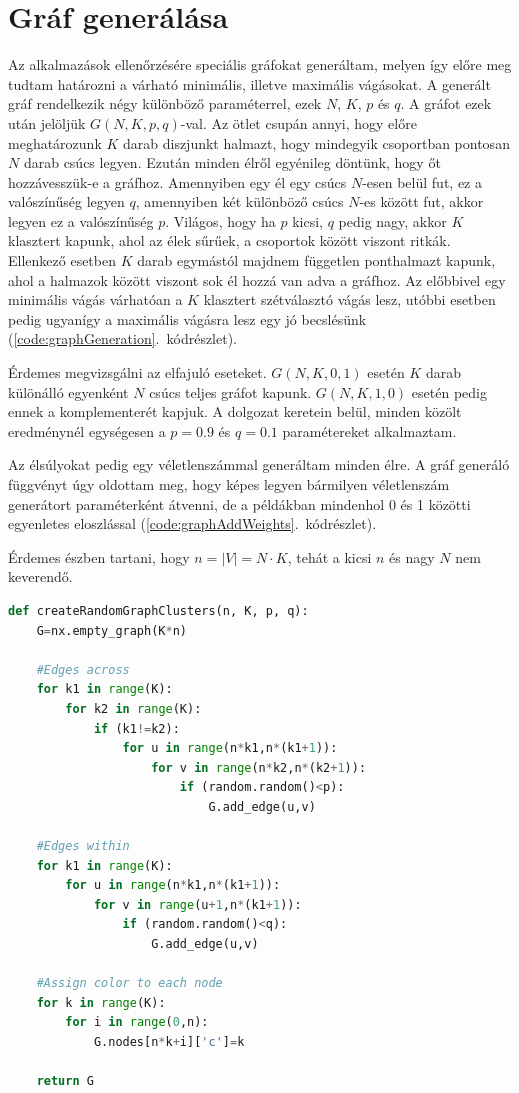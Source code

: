 \section{Gráf generálása}\label{sec:graphGeneration}
Az alkalmazások ellenőrzésére speciális gráfokat generáltam, melyen így előre meg tudtam határozni a várható minimális, illetve maximális vágásokat.
A generált gráf rendelkezik négy különböző paraméterrel, ezek $N$, $K$, $p$ és $q$.
A gráfot ezek után jelöljük $G(N,K,p,q)$-val.
Az ötlet csupán annyi, hogy előre meghatározunk $K$ darab diszjunkt halmazt, hogy mindegyik csoportban pontosan $N$ darab csúcs legyen. Ezután minden élről egyénileg döntünk, hogy őt hozzávesszük-e a gráfhoz. Amennyiben egy él egy csúcs $N$-esen belül fut, ez a valószínűség legyen $q$, amennyiben két különböző csúcs $N$-es között fut, akkor legyen ez a valószínűség $p$. Világos, hogy ha $p$ kicsi, $q$ pedig nagy, akkor $K$ klasztert kapunk, ahol az élek sűrűek, a csoportok között viszont ritkák. Ellenkező esetben $K$ darab egymástól majdnem független ponthalmazt kapunk, ahol a halmazok között viszont sok él hozzá van adva a gráfhoz. Az előbbivel egy minimális vágás várhatóan a $K$ klasztert szétválasztó vágás lesz, utóbbi esetben pedig ugyanígy a maximális vágásra lesz egy jó becslésünk (\ref{code:graphGeneration}.~kódrészlet). 

Érdemes megvizsgálni az elfajuló eseteket. $G(N,K,0,1)$ esetén $K$ darab különálló egyenként $N$ csúcs teljes gráfot kapunk. $G(N,K,1,0)$ esetén pedig ennek a komplementerét kapjuk. A dolgozat keretein belül, minden közölt eredménynél egységesen a $p=0.9$ és $q=0.1$ paramétereket alkalmaztam.

Az élsúlyokat pedig egy véletlenszámmal generáltam minden élre. A gráf generáló függvényt úgy oldottam meg, hogy képes legyen bármilyen véletlenszám generátort paraméterként átvenni, de a példákban mindenhol 0 és 1 közötti egyenletes eloszlással (\ref{code:graphAddWeights}.~kódrészlet).

Érdemes észben tartani, hogy $n=|V|=N \cdot K$, tehát a kicsi $n$ és nagy $N$ nem keverendő.

\begin{lstlisting}[language=python,caption=Gráf generálása,label=code:graphGeneration]	
def createRandomGraphClusters(n, K, p, q):
	G=nx.empty_graph(K*n)
	
	#Edges across
	for k1 in range(K):
		for k2 in range(K):
			if (k1!=k2):
				for u in range(n*k1,n*(k1+1)):
					for v in range(n*k2,n*(k2+1)):
						if (random.random()<p):
							G.add_edge(u,v)
	
	#Edges within
	for k1 in range(K):
		for u in range(n*k1,n*(k1+1)):
			for v in range(u+1,n*(k1+1)):
				if (random.random()<q):
					G.add_edge(u,v)
	
	#Assign color to each node
	for k in range(K):
		for i in range(0,n):
			G.nodes[n*k+i]['c']=k
	
	return G
	
\end{lstlisting}

